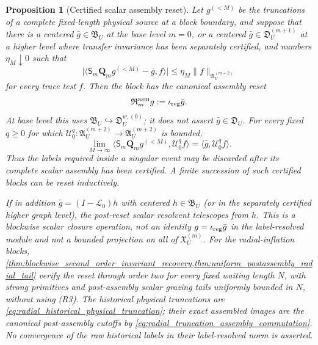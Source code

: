 \documentclass[11pt]{amsart}
\theoremstyle{compactplain}
\newtheorem{proposition}[theorem]{Proposition}
\theoremstyle{compactdefinition}
\theoremstyle{compactremark}
\newcommand{\Ltransfer}{\mathscr L}
\begin{document}
\begin{proposition}[Certified scalar assembly reset]
\label{prop:certified_scalar_assembly_reset}
Let \(g^{(<M)}\) be the truncations of a complete fixed-length physical
source at a block boundary, and suppose that there is a centered
\(\bar g\in\mathfrak B_U\) at the base level \(m=0\), or a centered
\(\bar g\in\mathfrak D_U^{(m+1)}\) at a higher level where transfer
invariance has been separately certified, and numbers \(\eta_M\downarrow0\)
such that
\begin{equation}
\label{eq:certified_scalar_reset_tail}
 \bigl|\langle \mathsf S_m\mathbf Q_m g^{(<M)}-\bar g,f\rangle\bigr|
 \le \eta_M\|f\|_{\mathfrak A_U^{(m+2)}}
\end{equation}
for every trace test \(f\).  Then the block has the canonical
\emph{assembly reset}
\[
 \mathfrak R_m^{\rm asm}g:=\iota_{\rm reg}\bar g.
\]
At base level this uses
\(\mathfrak B_U\hookrightarrow\mathfrak D_U^{w,(0)}\); it does not assert
\(\bar g\in\mathfrak D_U\).
For every fixed \(q\ge0\) for which
\(\mathscr U_0^q:\mathfrak A_U^{(m+2)}\to
\mathfrak A_U^{(m+2)}\) is bounded,
\begin{equation}
\label{eq:certified_scalar_reset_future_pairing}
 \lim_{M\to\infty}
 \langle \mathsf S_m\mathbf Q_m g^{(<M)},\mathscr U_0^qf\rangle
 =
 \langle\bar g,\mathscr U_0^qf\rangle .
\end{equation}
Thus the labels required inside a singular event may be discarded after its
complete scalar assembly has been certified.  A finite succession of such
certified blocks can be reset inductively.

If in addition \(\bar g=(I-\Ltransfer_0)h\) with centered
\(h\in\mathfrak B_U\) (or in the separately certified higher graph level), the
post-reset scalar resolvent telescopes from \(h\).  This is a blockwise scalar
closure operation, not an identity
\(g=\iota_{\rm reg}\bar g\) in the label-resolved module and not a bounded
projection on all of \(\mathfrak X_U^{(m)}\).
For the radial-inflation blocks,
\cref{thm:blockwise_second_order_invariant_recovery,thm:uniform_postassembly_radial_tail}
verify the reset through order two for every fixed waiting length \(N\), with
strong primitives and post-assembly scalar grazing tails uniformly bounded in
\(N\), without using (R3).  The historical physical truncations are
\eqref{eq:radial_historical_physical_truncation}; their exact assembled images
are the canonical post-assembly cutoffs by
\eqref{eq:radial_truncation_assembly_commutation}.  No convergence of the raw
historical labels in their label-resolved norm is asserted.
\end{proposition}
\end{document}

